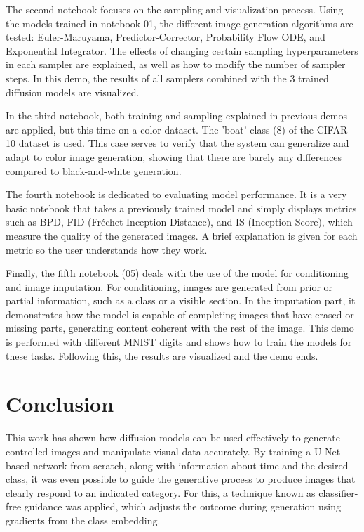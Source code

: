 \documentclass[11pt,a4paper]{article}
\begin{document}
The second notebook focuses on the sampling and visualization process. Using the models trained in notebook 01, the different image generation algorithms are tested: Euler-Maruyama, Predictor-Corrector, Probability Flow ODE, and Exponential Integrator. The effects of changing certain sampling hyperparameters in each sampler are explained, as well as how to modify the number of sampler steps. In this demo, the results of all samplers combined with the 3 trained diffusion models are visualized.

In the third notebook, both training and sampling explained in previous demos are applied, but this time on a color dataset. The 'boat' class (8) of the CIFAR-10 dataset is used. This case serves to verify that the system can generalize and adapt to color image generation, showing that there are barely any differences compared to black-and-white generation.

The fourth notebook is dedicated to evaluating model performance. It is a very basic notebook that takes a previously trained model and simply displays metrics such as BPD, FID (Fréchet Inception Distance), and IS (Inception Score), which measure the quality of the generated images. A brief explanation is given for each metric so the user understands how they work.

Finally, the fifth notebook (05) deals with the use of the model for conditioning and image imputation. For conditioning, images are generated from prior or partial information, such as a class or a visible section. In the imputation part, it demonstrates how the model is capable of completing images that have erased or missing parts, generating content coherent with the rest of the image. This demo is performed with different MNIST digits and shows how to train the models for these tasks. Following this, the results are visualized and the demo ends.

\section{Conclusion}
This work has shown how diffusion models can be used effectively to generate controlled images and manipulate visual data accurately. By training a U-Net-based network from scratch, along with information about time and the desired class, it was even possible to guide the generative process to produce images that clearly respond to an indicated category. For this, a technique known as classifier-free guidance was applied, which adjusts the outcome during generation using gradients from the class embedding.
\end{document}
